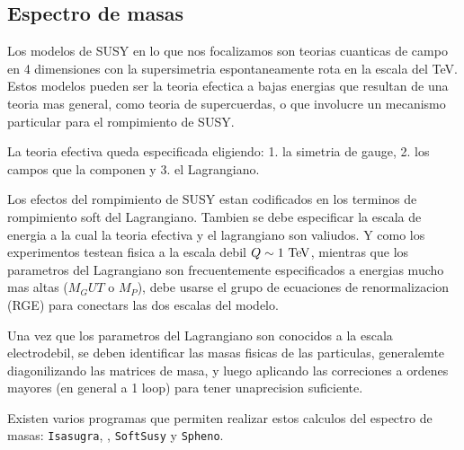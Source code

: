 



\subsection{Espectro de masas}

Los modelos de SUSY en lo que nos focalizamos son teorias cuanticas de campo
en 4 dimensiones con la supersimetria espontaneamente rota en la escala del TeV.
Estos modelos pueden ser la teoria efectica a bajas energias que resultan de
una teoria mas general, como teoria de supercuerdas, o que involucre un mecanismo
particular para el rompimiento de SUSY.

La teoria efectiva queda especificada eligiendo: 1. la simetria de gauge,
2. los campos que la componen y 3. el Lagrangiano.

Los efectos del rompimiento de SUSY estan codificados en los terminos de
rompimiento soft del Lagrangiano. Tambien se debe especificar la escala
de energia a la cual la teoria efectiva y el lagrangiano son valiudos.
Y como los experimentos testean fisica a la escala debil $Q\sim 1 \tev$,
mientras que los parametros del Lagrangiano son frecuentemente especificados a
energias mucho mas altas ($M_GUT$ o $M_P$), debe usarse el grupo de ecuaciones de renormalizacion (RGE)
para conectars las dos escalas del modelo.

Una vez que los parametros del Lagrangiano son conocidos a la escala
electrodebil, se deben identificar las masas fisicas de las particulas,
generalemte diagonilizando las matrices de masa, y luego aplicando las
correciones a ordenes mayores (en general a 1 loop) para tener
unaprecision suficiente.

Existen varios programas que permiten realizar estos calculos del
espectro de masas: \texttt{Isasugra}, \suspect, \texttt{SoftSusy} y
\texttt{Spheno}.


